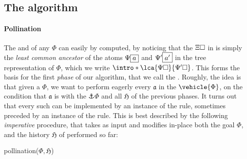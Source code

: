 \begin{scope}
\subsection{The algorithm}

\paragraph{Pollination}

\AP
The  and  of any  $\Phi$ can easily by
computed, by noticing that the  $\Xi\square$ in 
is simply the \emph{least common ancestor} of the atoms $\Psi\fbox{$a$}$ and
$\Psi'\fbox{$a'$}$ in the tree representation of $\Phi$, which we write
$\intro*\lca{\Psi\hole}{\Psi'\hole}$. This forms the basis for the first
\emph{phase} of our algorithm, that we call the . Roughly, the idea is
that given a  $\Phi$, we want to perform eagerly every
 $\mathfrak{a}$ in the  $\vehicle{\Phi}$, on the
condition that $\mathfrak{a}$ is  with the 
$\anchor{\Phi}$ and all  $\mathfrak{H}$ of the previous
phases. It turns out that every such  can be implemented by an
instance of the  rule, sometimes preceded by an instance of the
 rule. This is best described by the following \emph{imperative}
procedure, that takes as input and modifies in-place both the goal $\Phi$, and
the history $\mathfrak{H}$ of  performed so far:

\DontPrintSemicolon

\begin{procedure}[H]
  \caption{pollination($\Phi, \mathfrak{H}$)}
  \BlankLine

\end{procedure}


\end{scope}
